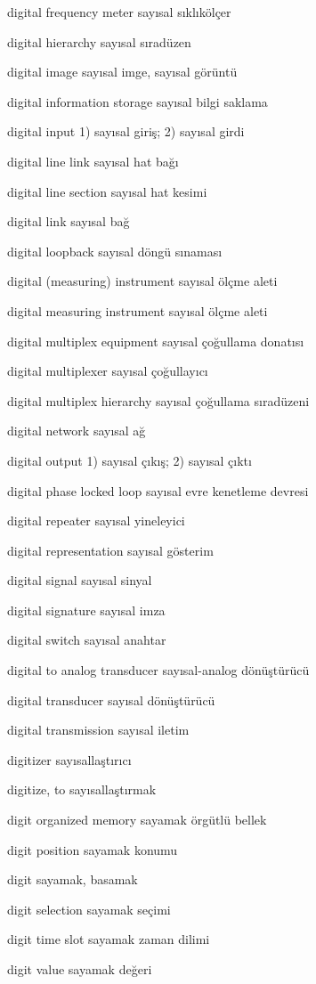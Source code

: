 \documentclass[12pt,fleqn]{article}\usepackage{../../common}
\begin{document}
digital frequency meter sayısal sıklıkölçer

digital hierarchy sayısal sıradüzen

digital image sayısal imge, sayısal görüntü

digital information storage sayısal bilgi saklama

digital input 1) sayısal giriş; 2) sayısal girdi

digital line link sayısal hat bağı

digital line section sayısal hat kesimi

digital link sayısal bağ

digital loopback sayısal döngü sınaması

digital (measuring) instrument sayısal ölçme aleti

digital measuring instrument sayısal ölçme aleti

digital multiplex equipment sayısal çoğullama donatısı

digital multiplexer sayısal çoğullayıcı

digital multiplex hierarchy sayısal çoğullama sıradüzeni

digital network sayısal ağ

digital output 1) sayısal çıkış; 2) sayısal çıktı

digital phase locked loop sayısal evre kenetleme devresi

digital repeater sayısal yineleyici

digital representation sayısal gösterim

digital signal sayısal sinyal

digital signature sayısal imza

digital switch sayısal anahtar

digital to analog transducer sayısal-analog dönüştürücü

digital transducer sayısal dönüştürücü

digital transmission sayısal iletim

digitizer sayısallaştırıcı

digitize, to sayısallaştırmak

digit organized memory sayamak örgütlü bellek

digit position sayamak konumu

digit sayamak, basamak

digit selection sayamak seçimi

digit time slot sayamak zaman dilimi

digit value sayamak değeri
\end{document}
